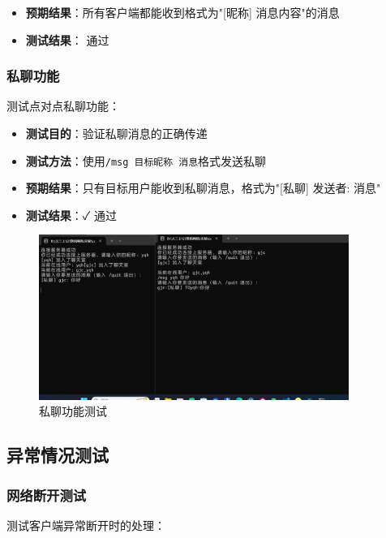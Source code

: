 \documentclass[12pt, a4paper]{article}
\newcommand{\cmd}[1]{\texttt{#1}}
\begin{document}
\begin{itemize}[itemsep=3pt]
  \item \textbf{预期结果}：所有客户端都能收到格式为"[昵称] 消息内容"的消息
  \item \textbf{测试结果}： 通过
\end{itemize}


\subsubsection{私聊功能}

测试点对点私聊功能：

\begin{itemize}[itemsep=3pt]
  \item \textbf{测试目的}：验证私聊消息的正确传递
  \item \textbf{测试方法}：使用\cmd{/msg 目标昵称 消息}格式发送私聊
  \item \textbf{预期结果}：只有目标用户能收到私聊消息，格式为"[私聊] 发送者: 消息"
  \item \textbf{测试结果}：✓ 通过
\end{itemize}

\begin{figure}[H]
   \centering
   \includegraphics[width=0.9\textwidth]{pic/private_chat_test.png}
   \caption{私聊功能测试}
   \label{fig:private_chat_test}
\end{figure}

\subsection{异常情况测试}

\subsubsection{网络断开测试}

测试客户端异常断开时的处理：
\end{document}
